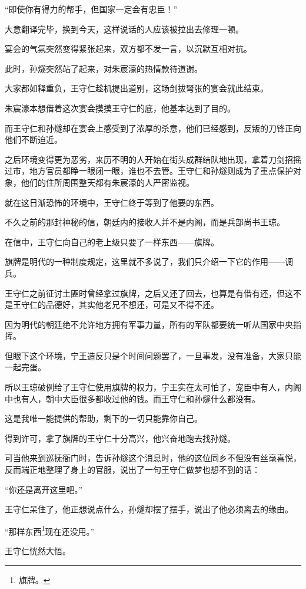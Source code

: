 \begin{multicols}{\theparacolNo}
“即使你有得力的帮手，但国家一定会有忠臣！”

大意翻译完毕，换到今天，这样说话的人应该被拉出去修理一顿。

宴会的气氛突然变得紧张起来，双方都不发一言，以沉默互相对抗。

此时，孙燧突然站了起来，对朱宸濠的热情款待道谢。

大家都如释重负，王守仁趁机提出道别，这场剑拔弩张的宴会就此结束。

朱宸濠本想借着这次宴会摸摸王守仁的底，他基本达到了目的。

而王守仁和孙燧却在宴会上感受到了浓厚的杀意，他们已经感到，反叛的刀锋正向他们不断迫近。

之后环境变得更为恶劣，来历不明的人开始在街头成群结队地出现，拿着刀剑招摇过市，地方官员都睁一眼闭一眼，谁也不去管。王守仁和孙燧则成为了重点保护对象，他们的住所周围整天都有朱宸濠的人严密监视。

就在这日渐恐怖的环境中，王守仁终于等到了他要的东西。

不久之前的那封神秘的信，朝廷内的接收人并不是内阁，而是兵部尚书王琼。

在信中，王守仁向自己的老上级只要了一样东西——旗牌。

旗牌是明代的一种制度规定，这里就不多说了，我们只介绍一下它的作用——调兵。

王守仁之前征讨土匪时曾经拿过旗牌，之后又还了回去，也算是有借有还，但这不是王守仁的品德好，其实他老兄不想还，可是又不得不还。

因为明代的朝廷绝不允许地方拥有军事力量，所有的军队都要统一听从国家中央指挥。

但眼下这个环境，宁王造反只是个时间问题罢了，一旦事发，没有准备，大家只能一起完蛋。

所以王琼破例给了王守仁使用旗牌的权力，宁王实在太可怕了，宠臣中有人，内阁中也有人，朝中大臣很多都收过他的钱。而王守仁和孙燧什么都没有。

这是我唯一能提供的帮助，剩下的一切只能靠你自己。

得到许可，拿了旗牌的王守仁十分高兴，他兴奋地跑去找孙燧。

可当他来到巡抚衙门时，告诉孙燧这个消息时，他的这位同乡不但没有丝毫喜悦，反而端正地整理了身上的官服，说出了一句王守仁做梦也想不到的话：

“你还是离开这里吧。”

王守仁呆住了，他正想说点什么，孙燧却摆了摆手，说出了他必须离去的缘由。

“那样东西\footnote{旗牌。}现在还没用。”

王守仁恍然大悟。


\end{multicols}
